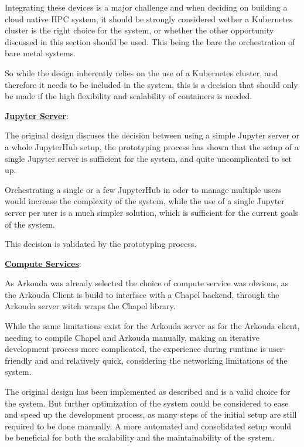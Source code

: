 Integrating these devices is a major challenge and when deciding on
building a cloud native \ac{HPC} system, it should be strongly considered
wether a Kubernetes cluster is the right choice for the system,
or whether the other opportunity discussed in this section should be used.
This being the bare the orchestration of bare metal systems.

So while the design inherently relies on the use of a Kubernetes cluster,
and therefore it needs to be included in the system, this is a
decision that should only be made if the high flexibility
and scalability of containers is needed.

\textbf{\hyperref[asp:jupyter_server]{Jupyter Server}}:

The original design discuses the decision between using a simple Jupyter server
or a whole JupyterHub setup, the prototyping process has shown that
the setup of a single Jupyter server is sufficient for the system,
and quite uncomplicated to set up.

Orchestrating a single or a few JupyterHub in oder to manage multiple users
would increase the complexity of the system, while the use of a single Jupyter server
per user is a much simpler solution, which is sufficient for the current goals of the system.

This decision is validated by the prototyping process.

\clearpage

\textbf{\hyperref[asp:compute_services]{Compute Services}}:

As Arkouda was already selected the choice of compute service was obvious,
as the Arkouda Client is build to interface with a Chapel backend, through the
Arkouda server witch wraps the Chapel library.

While the same limitations exist for the Arkouda server as for the
Arkouda client, needing to compile Chapel and Arkouda manually, making
an iterative development process more complicated, the experience during
runtime is user-friendly and and relatively quick, considering the
networking limitations of the system.

The original design has been implemented as described and is a valid choice for the system.
But further optimization of the system could be considered to ease and speed up the
development process, as many steps of the initial setup are still required to be done manually.
A more automated and consolidated setup would be beneficial for both the scalability and the
maintainability of the system.

